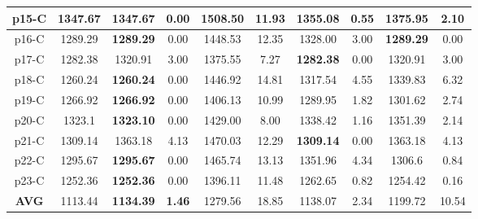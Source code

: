 \begin{table*}[]
{\begin{tabular}{@{}cccccccccc@{}}
			p15-C & 1347.67 & \textbf{1347.67} & 0.00 & 1508.50 & 11.93 & 1355.08 & 0.55 & 1375.95 & 2.10 \\ \midrule
			p16-C & 1289.29 & \textbf{1289.29} & 0.00 & 1448.53 & 12.35 & 1328.00 & 3.00 & \textbf{1289.29} & 0.00 \\ \midrule
			p17-C & 1282.38 & 1320.91 & 3.00 & 1375.55 & 7.27 & \textbf{1282.38} & 0.00 & 1320.91 & 3.00 \\ \midrule
			p18-C & 1260.24 & \textbf{1260.24} & 0.00 & 1446.92 & 14.81 & 1317.54 & 4.55 & 1339.83 & 6.32 \\ \midrule
			p19-C & 1266.92 & \textbf{1266.92} & 0.00 & 1406.13 & 10.99 & 1289.95 & 1.82 & 1301.62 & 2.74 \\ \midrule
			p20-C & 1323.1 & \textbf{1323.10} & 0.00 & 1429.00 & 8.00 & 1338.42 & 1.16 & 1351.39 & 2.14 \\ \midrule
			p21-C & 1309.14 & 1363.18 & 4.13 & 1470.03 & 12.29 & \textbf{1309.14} & 0.00 & 1363.18 & 4.13 \\ \midrule
			p22-C & 1295.67 & \textbf{1295.67} & 0.00 & 1465.74 & 13.13 & 1351.96 & 4.34 & 1306.6 & 0.84 \\ \midrule
			p23-C & 1252.36 & \textbf{1252.36} & 0.00 & 1396.11 & 11.48 & 1262.65 & 0.82 & 1254.42 & 0.16 \\ \midrule
			\textbf{AVG} & 1113.44 & \textbf{1134.39} & \textbf{1.46} & 1279.56 & 18.85 & 1138.07 & 2.34 & 1199.72 & 10.54 \\ \bottomrule
		\end{tabular}%
	}
\end{table*}